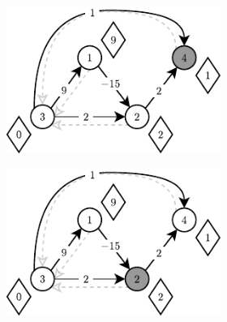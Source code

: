 \begin{figure}[!htbp]
\begin{subfigure}[b]{\textwidth}
\begin{subfigure}[b]{0.31\textwidth}
			\includegraphics[width=\textwidth]{Chapter_II/DIJKSTRA-NegativeArc/c.pdf}
			\caption{}
			\label{fig:exapleDijkstraNegativArc:c}
		\end{subfigure}
		\hfill\null
	\end{subfigure}
	\begin{subfigure}[b]{\textwidth}
		\null\hfill
		\begin{subfigure}[b]{0.31\textwidth}
			\includegraphics[width=\textwidth]{Chapter_II/DIJKSTRA-NegativeArc/d.pdf}
			\caption{}
			\label{fig:exapleDijkstraNegativArc:d}
		\end{subfigure}
		\hfill
		\begin{subfigure}[b]{0.31\textwidth}

\end{subfigure}
\end{subfigure}
\end{figure}
